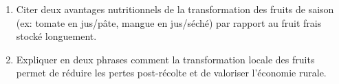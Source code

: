 \documentclass[11pt]{article}
\begin{document}
\begin{exercice}
\begin{enumerate}
    \item Citer deux avantages nutritionnels de la transformation des fruits de saison (ex: tomate en jus/pâte, mangue en jus/séché) par rapport au fruit frais stocké longuement.
    \item Expliquer en deux phrases comment la transformation locale des fruits permet de réduire les pertes post-récolte et de valoriser l'économie rurale.
\end{enumerate}
\end{exercice}
\end{document}
